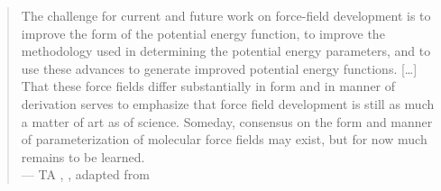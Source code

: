 \begin{quote}
The challenge for current and future work on force-field development is to
improve the form of the potential energy function, to improve the methodology
used in determining the potential energy parameters, and to use these
advances to generate improved potential energy functions.
[\dots] That these force fields differ substantially in form and in manner of
derivation serves to emphasize that force field development is still as much a
matter of art as of science. Someday, consensus on the form and manner of
parameterization of molecular force fields may exist, but for now much remains
to be learned.
\\ \phantom{abc} \hfill
--- TA \citeauthor{Halgren1995}, \citeyear{Halgren1995}, adapted from 
\end{quote}


